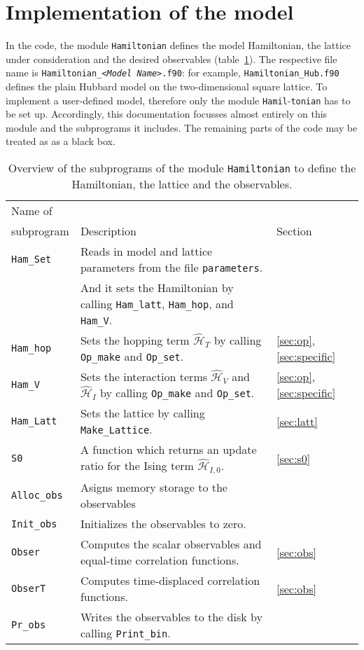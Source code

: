 \section{Implementation of the model} \label{sec:imp}
 In the code, the module \texttt{Hamiltonian} defines the model Hamiltonian,  the lattice under consideration and the desired observables (table~\ref{table:hamiltonian}).
The respective file name is \texttt{Hamiltonian\_\textit{<Model Name>}.f90}: for example, \texttt{Hamiltonian\_Hub.f90} defines the plain Hubbard model on the two-dimensional square lattice. To implement a user-defined model, therefore only the module \texttt{Hamil}-\texttt{tonian} has to be set up. Accordingly, this documentation focusses almost entirely  on this module and the subprograms it includes. 
The remaining parts of the code may be treated as as a black box.

%
\begin{table}[h]
   \begin{tabular}{l l l}
    Name of &  &  \\
    subprogram & Description & Section \\\hline
    \texttt{Ham\_Set}  & Reads in model and lattice parameters from the file \texttt{parameters}. \\
                       & And it sets the Hamiltonian by calling \texttt{Ham\_latt}, \texttt{Ham\_hop}, and \texttt{Ham\_V}. & \\
    \texttt{Ham\_hop}  & Sets the hopping term  $\hat{\mathcal{H}}_{T}$ by calling \texttt{Op\_make} and \texttt{Op\_set}. & \ref{sec:op}, \ref{sec:specific}\\
    \texttt{Ham\_V}    & Sets the interaction terms  $\hat{\mathcal{H}}_{V}$ and $\hat{\mathcal{H}}_{I}$ 
                         by calling \texttt{Op\_make} and \texttt{Op\_set}.& \ref{sec:op}, \ref{sec:specific}\\  
    \texttt{Ham\_Latt} & Sets the lattice by calling \texttt{Make\_Lattice}.& \ref{sec:latt}\\
    \texttt{S0}        & A function which returns an update ratio for the Ising term $\hat{\mathcal{H}}_{I,0}$. 
    & \ref{sec:s0} \\
    \texttt{Alloc\_obs} & Asigns memory storage to the observables & \\
    \texttt{Init\_obs}  & Initializes the observables to zero. & \\
    \texttt{Obser}      & Computes the scalar observables and equal-time correlation functions. & \ref{sec:obs} \\
    \texttt{ObserT}     & Computes time-displaced correlation functions. & \ref{sec:obs}\\
    \texttt{Pr\_obs}    & Writes the observables to the disk by calling \texttt{Print\_bin}.   
    
   \end{tabular}
   \caption{   Overview of the subprograms of the  module \texttt{Hamiltonian} to define the Hamiltonian, the lattice and the observables.
    \label{table:hamiltonian}}
\end{table}
%

